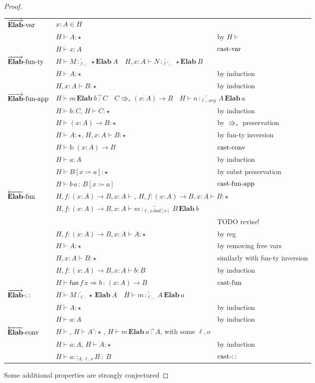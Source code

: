 \begin{proof}
\begin{tabular}{lll}
$\operatorname{\overrightarrow{\textbf{Elab}}-var}$ & $x:A\in H$ & \tabularnewline
 & $H\vdash A:\star$ & by $H\vdash$\tabularnewline
 & $H\vdash x:A$ & $\operatorname{cast-var}$\tabularnewline
$\operatorname{\overrightarrow{\textbf{Elab}}-fun-ty}$ & \multicolumn{2}{l}{$H\vdash M\overleftarrow{\,:_{\ell,.}\,}\star\textbf{Elab}\ A\quad H,x:A\vdash N\overleftarrow{\,:_{\ell',.}\,}\star\textbf{Elab}\ B$}\tabularnewline
 & $H\vdash A:\star$ & by induction\tabularnewline
 & $H,x:A\vdash B:\star$ & by induction\tabularnewline
$\operatorname{\overrightarrow{\textbf{Elab}}-fun-app}$ & \multicolumn{2}{l}{$H\vdash m\,\textbf{Elab}\ b\overrightarrow{\,:\,}C\quad C\Rrightarrow_{\ast}\left(x:A\right)\rightarrow B\quad H\vdash n\overleftarrow{\,:_{\ell,.arg}\,}A\,\textbf{Elab}\,a$}\tabularnewline
 & $H\vdash b:C$, $H\vdash C:\star$ & by induction\tabularnewline
 & $H\vdash\left(x:A\right)\rightarrow B:\star$ & by $\Rrightarrow_{\ast}$ preservation\tabularnewline
 & $H\vdash A:\star$, $H,x:A\vdash B:\star$ & by fun-ty inversion\tabularnewline
 & $H\vdash b:\left(x:A\right)\rightarrow B$ & $\operatorname{cast-conv}$\tabularnewline
 & $H\vdash a:A$ & by induction\tabularnewline
 & $H\vdash B\left[x\coloneqq a\right]:\star$ & by subst preservation\tabularnewline
 & $H\vdash b\,a\,:\,B\left[x\coloneqq a\right]$ & $\operatorname{cast-fun-app}$\tabularnewline
$\operatorname{\overleftarrow{\textbf{Elab}}-fun}$ & \multicolumn{2}{l}{$H,f:\left(x:A\right)\rightarrow B,x:A\vdash$, $H,f:\left(x:A\right)\rightarrow B,x:A\vdash B:\star$}\tabularnewline
 & $H,f:\left(x:A\right)\rightarrow B,x:A\vdash m\overleftarrow{\,:_{\ell,o.bod[x]}\,}B\,\textbf{Elab}\ b$ & \tabularnewline
 &  & TODO revise!\tabularnewline
 & $H,f:\left(x:A\right)\rightarrow B,x:A\vdash A:\star$ & by reg\tabularnewline
 & $H\vdash A:\star$ & by removing free vars\tabularnewline
 & $H,x:A\vdash B:\star$ & similarly with fun-ty inversion\tabularnewline
 & $H,f:\left(x:A\right)\rightarrow B,x:A\vdash b:B$ & by induction\tabularnewline
 & $H\vdash\mathsf{fun}\,f\,x\Rightarrow b\,:\,\left(x:A\right)\rightarrow B$ & $\operatorname{cast-fun}$\tabularnewline
$\operatorname{\overrightarrow{\textbf{Elab}}-::}$ & \multicolumn{2}{l}{$H\vdash M\overleftarrow{\,:_{\ell.}\,}\star\,\textbf{Elab}\ A\quad H\vdash m\overleftarrow{\,:_{\ell,.}\,}A\,\textbf{Elab}\ a$}\tabularnewline
 & $H\vdash A:\star$ & by induction\tabularnewline
 & $H\vdash a:A$ & by induction\tabularnewline
$\operatorname{\overleftarrow{\textbf{Elab}}-conv}$ & $H\vdash$, $H\vdash A':\star$ , $H\vdash m\,\textbf{Elab}\ a\overrightarrow{\,:\,}A$,
with some $\ell,o$ & \tabularnewline
 & $H\vdash a:A$, $H\vdash A:\star$ & by induction\tabularnewline
 & $H\vdash a::_{A,\ensuremath{\ell},o}B\::\:B$ & $\operatorname{cast-::}$\tabularnewline
\end{tabular}

Some additional properties are strongly conjectured
\end{proof}

